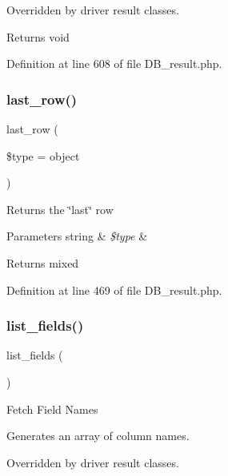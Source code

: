 Overridden by driver result classes.

\begin{DoxyReturn}{Returns}
void 
\end{DoxyReturn}


Definition at line 608 of file D\+B\+\_\+result.\+php.

\mbox{\label{class_c_i___d_b__result_a2c420342d5b577d91b6b993be86f68c0}} 
\subsubsection{\texorpdfstring{last\_row()}{last\_row()}}
{\footnotesize\ttfamily last\+\_\+row (\begin{DoxyParamCaption}\item[{}]{\$type = {\ttfamily \textquotesingle{}object\textquotesingle{}} }\end{DoxyParamCaption})}

Returns the \char`\"{}last\char`\"{} row


\begin{DoxyParams}[1]{Parameters}
string & {\em \$type} & \\
\hline
\end{DoxyParams}
\begin{DoxyReturn}{Returns}
mixed 
\end{DoxyReturn}


Definition at line 469 of file D\+B\+\_\+result.\+php.

\mbox{\label{class_c_i___d_b__result_a50b54eb4ea7cfd039740f532988ea776}} 
\subsubsection{\texorpdfstring{list\_fields()}{list\_fields()}}
{\footnotesize\ttfamily list\+\_\+fields (\begin{DoxyParamCaption}{ }\end{DoxyParamCaption})}

Fetch Field Names

Generates an array of column names.

Overridden by driver result classes.


